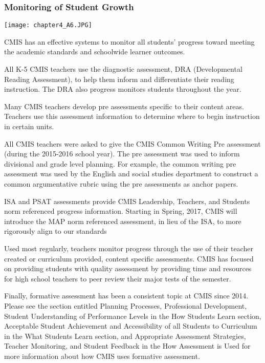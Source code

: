 \subsubsection{Monitoring of Student Growth}

{\centering\texttt{[image: chapter4\_A6.JPG]}}



\begin{findings}
CMIS has an effective systems to monitor all students’ progress toward meeting the academic standards and schoolwide learner outcomes.

 
All K-5 CMIS teachers use the diagnostic assessment, DRA (Developmental Reading Assessment), to help them inform and differentiate their reading instruction. The DRA also progress monitors students throughout the year. 

Many CMIS teachers develop pre assessments specific to their content areas. Teachers use this assessment information to determine where to begin instruction in certain units. 

All CMIS teachers were asked to give the CMIS Common Writing Pre assessment (during the 2015-2016 school year). The pre assessment was used to inform divisional and grade level planning. For example, the common writing pre assessment was used by the English and social studies department to construct a common argumentative rubric using the pre assessments as anchor papers.

ISA and PSAT assessments provide CMIS Leadership, Teachers, and Students norm referenced progress information. Starting in Spring, 2017, CMIS will introduce the MAP norm referenced assessment, in lieu of the ISA, to more rigorously align to our standards 

Used most regularly, teachers monitor progress through the use of their teacher created or curriculum provided, content specific assessments. CMIS has focused on providing students with quality assessment by providing time and resources for high school teachers to peer review their major tests of the semester. 

Finally, formative assessment has been a consistent topic at CMIS since 2014. Please see the section entitled Planning Processes, Professional Development, Student Understanding of Performance Levels in the How Students Learn section, Acceptable Student Achievement and Accessibility of all Students to Curriculum in the What Students Learn section, and Appropriate Assessment Strategies, Teacher Monitoring, and Student Feedback in the How Assessment is Used for more information about how CMIS uses formative assessment. 


\end{findings}
